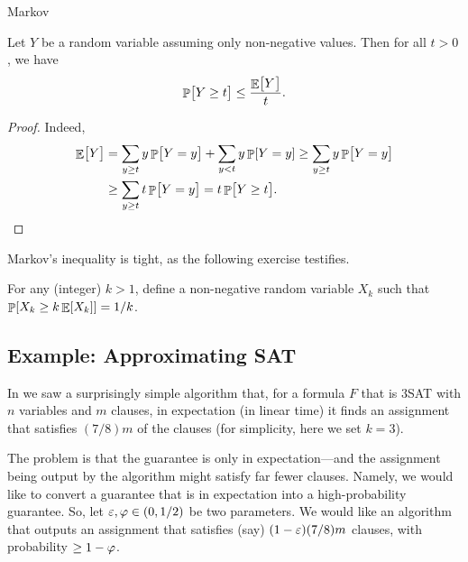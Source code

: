 \begin{fragment}{Markov}
    \begin{theorem}
        Let $Y$ be a random variable assuming only non-negative
        values. Then for all $t >0$, we have
        \begin{equation*}
            \Prob{\bigl. Y \geq t} \leq \frac{\Ex{\bigl. Y \ts }}{t}.
        \end{equation*}
    \end{theorem}
\end{fragment}
\begin{proof}
    Indeed,
    \begin{align*}
      \Ex{\bigl. Y}%
      &=%
        \sum_{y\geq t} y \Prob{\bigl. Y = y} + \sum_{y < t} y \Prob{Y
        = y }%
        \geq%
        \sum_{y\geq t} y \Prob{\bigl. Y = y}%
      \\&%
      \geq%
      \sum_{y\geq t} t \Prob{\bigl. Y = y}%
      =%
      t \Prob{ \bigl. Y \geq t}.
    \end{align*}
\end{proof}

Markov's inequality is tight, as the following exercise testifies.
\begin{exercise}
    For any (integer) $k >1$, define a non-negative random variable $X_k$
    such that
    $\displaystyle \Prob{ \MakeBig X_k \geq k \Ex{X_k}} = {1}/{k}$.
\end{exercise}



\subsection{Example: Approximating  SAT}

In  we saw a surprisingly simple algorithm
that, for a formula $F$ that is $3$SAT with $n$ variables and $m$
clauses, in expectation (in linear time) it finds an assignment that
satisfies $(7/8)m$  of the clauses (for simplicity, here we set
$k=3$).

The problem is that the guarantee is only in expectation---and the
assignment being output by the algorithm might satisfy far fewer
clauses. Namely, we would like to convert a guarantee that is in
expectation into a high-probability guarantee. So, let
${\varepsilon},\varphi \in (0,1/2)$ be two parameters. We would like an algorithm
that outputs an assignment that satisfies (say) $(1-{\varepsilon})(7/8)m$ clauses,
with probability $\geq 1- \varphi$.

